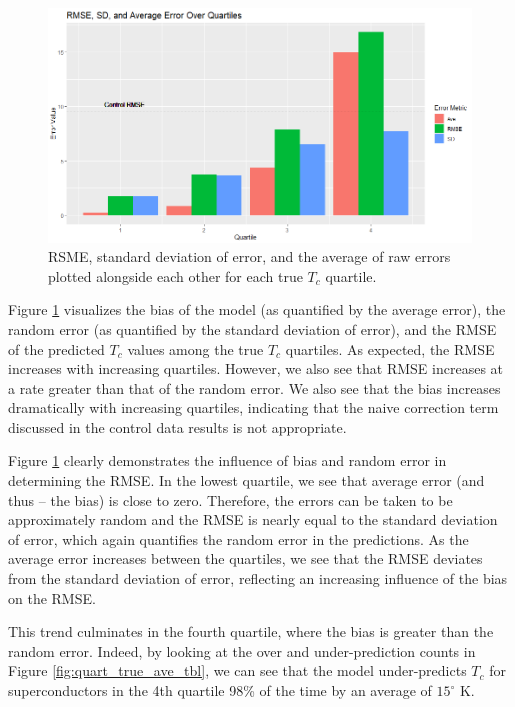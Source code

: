 \documentclass[oneside,12pt]{amsart}
\begin{document}
 \begin{figure}
     \centering
     \includegraphics[width=\linewidth]{True_Q_Ave_brplt.png}
     \caption{RSME, standard deviation of error, and the average of raw errors plotted alongside each other for each true $T_c$ quartile.}
     \label{fig:True_Q_Ave_brplt}
 \end{figure}
  
  Figure \ref{fig:True_Q_Ave_brplt} visualizes the bias of the model (as quantified by the average error), the random error (as quantified by the standard deviation of error), and the RMSE of the predicted $T_c$ values among the true $T_c$ quartiles. As expected, the RMSE increases with increasing quartiles. However, we also see that RMSE increases at a rate greater than that of the random error. We also see that the bias increases dramatically with increasing quartiles, indicating that the naive correction term discussed in the control data results is not appropriate.
  
 Figure \ref{fig:True_Q_Ave_brplt} clearly demonstrates the influence of bias and random error in determining the RMSE. In the lowest quartile, we see that average error (and thus -- the bias) is close to zero. Therefore, the errors can be taken to be approximately random and the RMSE is nearly equal to the standard deviation of error, which again quantifies the random error in the predictions. As the average error increases between the quartiles, we see that the RMSE deviates from the standard deviation of error, reflecting an increasing influence of the bias on the RMSE.
  
  This trend culminates in the fourth quartile, where the bias is greater than the random error. Indeed, by looking at the over and under-prediction counts in Figure \ref{fig:quart_true_ave_tbl}, we can see that the model under-predicts $T_c$ for superconductors in the 4th quartile 98\% of the time by an average of $15^\circ$ K.
  
\end{document}
